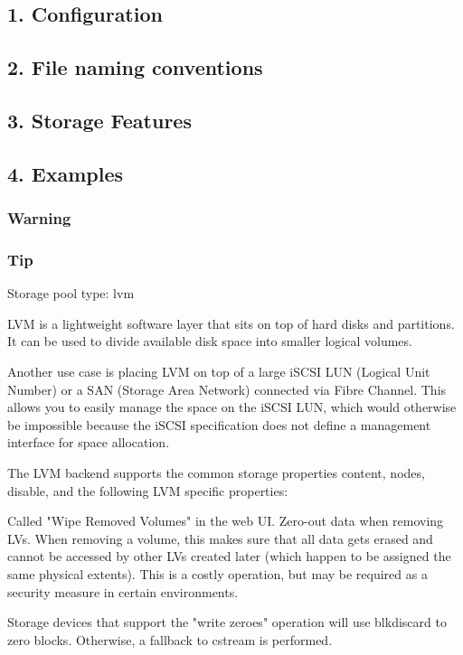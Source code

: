 \subsection{1. Configuration}

\subsection{2. File naming conventions}

\subsection{3. Storage Features}

\subsection{4. Examples}

\subsubsection{Warning}

\subsubsection{Tip}

Storage pool type: lvm

LVM is a lightweight software layer that sits on top of hard disks and partitions. It can be used to divide available disk space into smaller logical volumes.

Another use case is placing LVM on top of a large iSCSI LUN (Logical Unit Number) or a SAN (Storage Area Network) connected via Fibre Channel. This allows you to easily manage the space on the iSCSI LUN, which would otherwise be impossible because the iSCSI specification does not define a management interface for space allocation.

The LVM backend supports the common storage properties content, nodes, disable, and the following LVM specific properties:

Called "Wipe Removed Volumes" in the web UI. Zero-out data when removing LVs. When removing a volume, this makes sure that all data gets erased and cannot be accessed by other LVs created later (which happen to be assigned the same physical extents). This is a costly operation, but may be required as a security measure in certain environments.

Storage devices that support the "write zeroes" operation will use blkdiscard to zero blocks. Otherwise, a fallback to cstream is performed.

